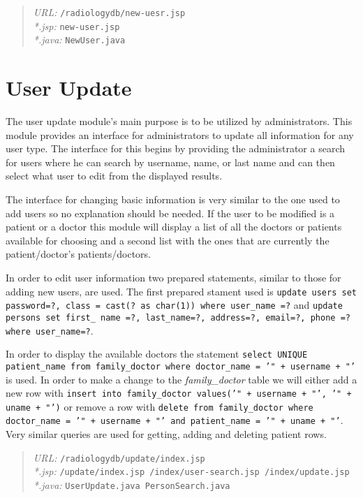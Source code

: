 \documentclass[12pt]{report}
\begin{document}
\begin{quote}
\emph{URL:} \texttt{/radiologydb/new-uesr.jsp} \\
\emph{*.jsp: } \texttt{new-user.jsp} \\
\emph{*.java: } \texttt{NewUser.java}
\end{quote}

\section*{User Update}
The user update module's main purpose is to be utilized by administrators. This module provides an interface for administrators to update all information for any user type. The interface for this begins by providing the administrator a search for users where he can search by username, name, or last name and can then select what user to edit from the displayed results.

The interface for changing basic information is very similar to the one used to add users so no explanation should be needed. If the user to be modified is a patient or a doctor this module will display a list of all the doctors or patients available for choosing and a second list with the ones that are currently the patient/doctor's patients/doctors.

In order to edit user information two prepared statements, similar to those for adding new users, are used. The first prepared stament used is \texttt{update users set password=?, class = cast(? as char(1)) where user\_name =?} and \texttt{update persons set first\_ name =?, last\_name=?, address=?, email=?, phone =? where user\_name=?}.

In order to display the available doctors the statement \texttt{select UNIQUE patient\_name from family\_doctor where doctor\_name = '" + username + "'} is used. In order to make a change to the \emph{family\_doctor} table we will either add a new row with \texttt{insert into family\_doctor values('" + username + "', '" + uname + "')} or remove a row with \texttt{delete from family\_doctor where doctor\_name = '" + username + "' and patient\_name = '" + uname + "'}. Very similar queries are used for getting, adding and deleting patient rows.

\begin{quote}
\emph{URL:} \texttt{/radiologydb/update/index.jsp} \\
\emph{*.jsp: } \texttt{/update/index.jsp /index/user-search.jsp /index/update.jsp} \\
\emph{*.java: } \texttt{UserUpdate.java PersonSearch.java}
\end{quote}
\end{document}
